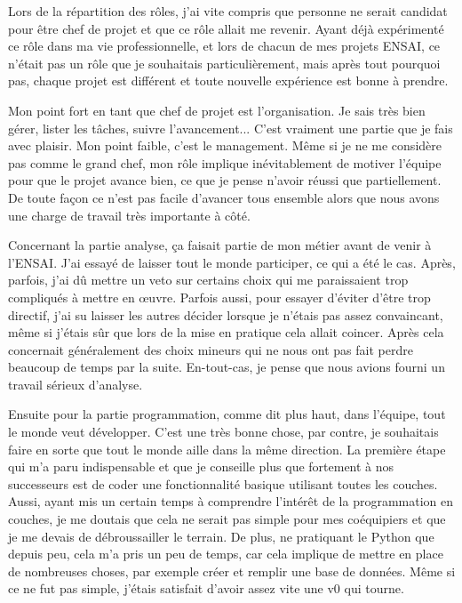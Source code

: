 \documentclass[11pt]{article}
\begin{document}
\bigbreak

Lors de la répartition des rôles, j'ai vite compris que personne ne serait candidat pour être chef de projet et que ce rôle allait me revenir. Ayant déjà expérimenté ce rôle dans ma vie professionnelle, et lors de chacun de mes projets ENSAI, ce n'était pas un rôle que je souhaitais particulièrement, mais après tout pourquoi pas, chaque projet est différent et toute nouvelle expérience est bonne à prendre.

\bigbreak

Mon point fort en tant que chef de projet est l'organisation. Je sais très bien gérer, lister les tâches, suivre l'avancement... C'est vraiment une partie que je fais avec plaisir. Mon point faible, c'est le management. Même si je ne me considère pas comme le grand chef, mon rôle implique inévitablement de motiver l'équipe pour que le projet avance bien, ce que je pense n'avoir réussi que partiellement. De toute façon ce n'est pas facile d'avancer tous ensemble alors que nous avons une charge de travail très importante à côté.

\bigbreak

Concernant la partie analyse, ça faisait partie de mon métier avant de venir à l'ENSAI. J'ai essayé de laisser tout le monde participer, ce qui a été le cas. Après, parfois, j'ai dû mettre un veto sur certains choix qui me paraissaient trop compliqués à mettre en œuvre. Parfois aussi, pour essayer d'éviter d'être trop directif, j'ai su laisser les autres décider lorsque je n'étais pas assez convaincant, même si j'étais sûr que lors de la mise en pratique cela allait coincer. Après cela concernait généralement des choix mineurs qui ne nous ont pas fait perdre beaucoup de temps par la suite. En-tout-cas, je pense que nous avions fourni un travail sérieux d'analyse.

\bigbreak

Ensuite pour la partie programmation, comme dit plus haut, dans l'équipe, tout le monde veut développer. C'est une très bonne chose, par contre, je souhaitais faire en sorte que tout le monde aille dans la même direction. La première étape qui m'a paru indispensable et que je conseille plus que fortement à nos successeurs est de coder une fonctionnalité basique utilisant toutes les couches. Aussi, ayant mis un certain temps à comprendre l'intérêt de la programmation en couches, je me doutais que cela ne serait pas simple pour mes coéquipiers et que je me devais de débroussailler le terrain. De plus, ne pratiquant le Python que depuis peu, cela m'a pris un peu de temps, car cela implique de mettre en place de nombreuses choses, par exemple créer et remplir une base de données. Même si ce ne fut pas simple, j'étais satisfait d'avoir assez vite une v0 qui tourne.
\end{document}
